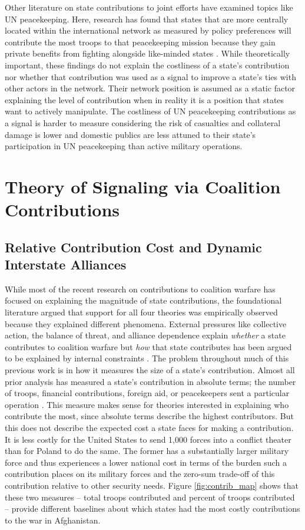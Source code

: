 \documentclass[12pt,letterpaper]{article}
\begin{document}
	Other literature on state contributions to joint efforts have examined topics like UN peacekeeping. Here, research has found that states that are more centrally located within the international network as measured by policy preferences will contribute the most troops to that peacekeeping mission because they gain private benefits from fighting alongside like-minded states \citep{dorussen_networkedinternationalpolitics_2016}. While theoretically important, these findings do not explain the costliness of a state's contribution nor whether that contribution was used as a signal to improve a state's ties with other actors in the network. Their network position is assumed as a static factor explaining the level of contribution when in reality it is a position that states want to actively manipulate. The costliness of UN peacekeeping contributions as a signal is harder to measure considering the risk of casualties and collateral damage is lower and domestic publics are less attuned to their state's participation in UN peacekeeping than active military operations.

\section{Theory of Signaling via Coalition Contributions}
	\subsection{Relative Contribution Cost and Dynamic Interstate Alliances}
		While most of the recent research on contributions to coalition warfare has focused on explaining the magnitude of state contributions, the foundational literature argued that support for all four theories was empirically observed because they explained different phenomena. External pressures like collective action, the balance of threat, and alliance dependence explain \textit{whether} a state contributes to coalition warfare but \textit{how} that state contributes has been argued to be explained by internal constraints \citep{bennett_burdensharingpersiangulf_1994}. The problem throughout much of this previous work is in how it measures the size of a state's contribution. Almost all prior analysis has measured a state's contribution in absolute terms; the number of troops, financial contributions, foreign aid, or peacekeepers sent a particular operation \citep{mello_democraticparticipationarmed_2014, haesebrouck_explainingmemberstates_2016}. This measure makes sense for theories interested in explaining who contribute the most, since absolute terms describe the highest contributors. But this does not describe the expected cost a state faces for making a contribution. It is less costly for the United States to send 1,000 forces into a conflict theater than for Poland to do the same. The former has a substantially larger military force and thus experiences a lower national cost in terms of the burden such a contribution places on its military forces and the zero-sum trade-off of this contribution relative to other security needs. Figure \ref{fig:contrib_map} shows that these two measures -- total troops contributed and percent of troops contributed -- provide different baselines about which states had the most costly contributions to the war in Afghanistan.
\end{document}
